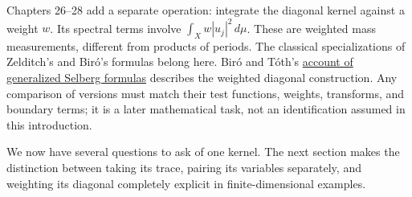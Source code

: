 Chapters 26--28 add a separate operation: integrate the diagonal kernel against a weight \(w\). Its spectral terms involve \(\int_X w|u_j|^2\,d\mu\). These are weighted mass measurements, different from products of periods. The classical specializations of Zelditch's and Bir\'o's formulas belong here. Bir\'o and T\'oth's \href{https://arxiv.org/abs/2309.02163}{account of generalized Selberg formulas} describes the weighted diagonal construction. Any comparison of versions must match their test functions, weights, transforms, and boundary terms; it is a later mathematical task, not an identification assumed in this introduction.

We now have several questions to ask of one kernel. The next section makes the distinction between taking its trace, pairing its variables separately, and weighting its diagonal completely explicit in finite-dimensional examples.
